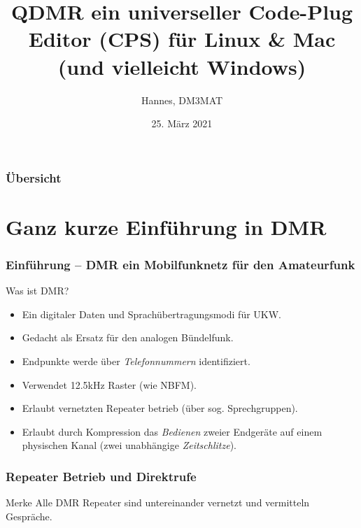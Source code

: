 \documentclass[aspectratio=169]{beamer}
\title[QDMR]{QDMR ein universeller Code-Plug Editor (CPS) für Linux \& Mac\\ (und vielleicht Windows)}
\subtitle{}
\author{Hannes, DM3MAT}
\institute{\texttt{dm3mat [at] darc [dot] de}}
\date{25. März 2021}
\begin{document}
\begin{frame}
 \titlepage
\end{frame}

\begin{frame} \frametitle{Übersicht}
 \tableofcontents
\end{frame}



\section{Ganz kurze Einführung in DMR}
\begin{frame} \frametitle{Einführung -- DMR ein Mobilfunknetz für den Amateurfunk} 
\begin{block}{Was ist DMR?}
 \begin{itemize}
  \item Ein digitaler Daten und Sprachübertragungsmodi für UKW.
  \item Gedacht als Ersatz für den analogen Bündelfunk.
  \item Endpunkte werde über \emph{Telefonnummern} identifiziert.
  \item Verwendet 12.5kHz Raster (wie NBFM). 
  \item Erlaubt vernetzten Repeater betrieb (über sog. Sprechgruppen).
  \item Erlaubt durch Kompression das \emph{Bedienen} zweier Endgeräte auf einem physischen Kanal (zwei unabhängige \emph{Zeitschlitze}).
 \end{itemize}
\end{block}
\end{frame}

\begin{frame} \frametitle{Repeater Betrieb und Direktrufe}
 \begin{block}{Merke}
  Alle DMR Repeater sind untereinander vernetzt und vermitteln Gespräche.
 \end{block}
 \begin{center}
   
 \end{center}
\end{frame}
\end{document}
